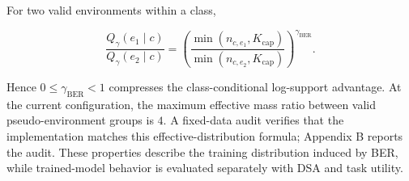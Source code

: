 For two valid environments within a class,

\[
\frac{Q_\gamma(e_1\mid c)}{Q_\gamma(e_2\mid c)}
=
\left(
\frac{\min(n_{c,e_1},K_{\mathrm{cap}})}
{\min(n_{c,e_2},K_{\mathrm{cap}})}
\right)^{\gamma_{\mathrm{BER}}}.
\]

Hence \(0\le\gamma_{\mathrm{BER}}<1\) compresses the class-conditional log-support advantage. At the current configuration, the maximum effective mass ratio between valid pseudo-environment groups is \(4\). A fixed-data audit verifies that the implementation matches this effective-distribution formula; Appendix B reports the audit. These properties describe the training distribution induced by BER, while trained-model behavior is evaluated separately with DSA and task utility.
